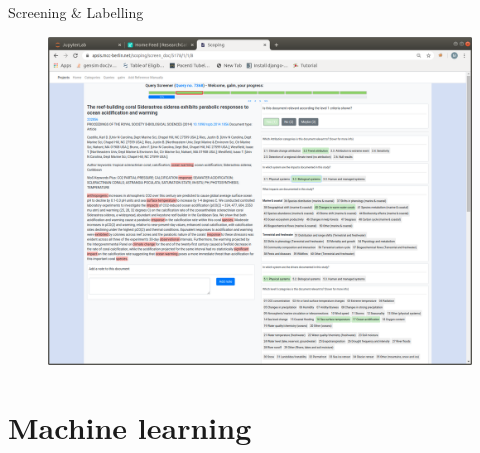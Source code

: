 \documentclass[9pt]{beamer}
\begin{document}
\begin{frame}{Screening \& Labelling}

\begin{figure}
	\includegraphics[width=\linewidth]{../plots/screening-platform}
\end{figure}

\end{frame}



\section{Machine learning}
\end{document}
